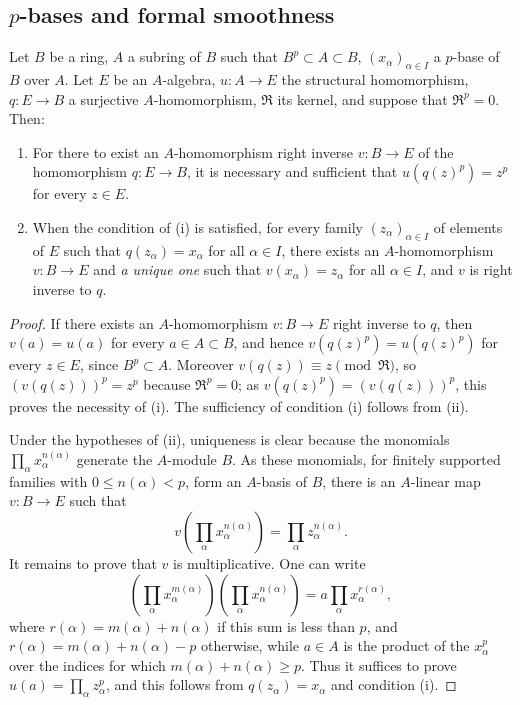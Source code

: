 \subsection{\texorpdfstring{$p$}{p}-bases and formal smoothness}
\label{subsection:0.21.2}

\begin{theorem}[21.2.1]
\label{0.21.2.1}
Let $B$ be a ring, $A$ a subring of $B$ such that $B^p\subset A\subset B$, $(x_\alpha)_{\alpha\in I}$ a $p$-base of $B$ over $A$.
Let $E$ be an $A$-algebra, $u:A\to E$ the structural homomorphism, $q:E\to B$ a surjective $A$-homomorphism, $\mathfrak{R}$ its kernel, and suppose that $\mathfrak{R}^p=0$.
Then:
\begin{enumerate}
  \item[\rm(i)] For there to exist an $A$-homomorphism right inverse $v:B\to E$ of the homomorphism $q:E\to B$, it is necessary and sufficient that $u(q(z)^p)=z^p$ for every $z\in E$.
  \item[\rm(ii)] When the condition of \textup{(i)} is satisfied, for every family $(z_\alpha)_{\alpha\in I}$ of elements of $E$ such that $q(z_\alpha)=x_\alpha$ for all $\alpha\in I$, there exists an $A$-homomorphism $v:B\to E$ and \emph{a unique one} such that $v(x_\alpha)=z_\alpha$ for all $\alpha\in I$, and $v$ is right inverse to $q$.
\end{enumerate}
\end{theorem}

\begin{proof}
If there exists an $A$-homomorphism $v:B\to E$ right inverse to $q$, then $v(a)=u(a)$ for every $a\in A\subset B$, and hence $v(q(z)^p)=u(q(z)^p)$ for every $z\in E$, since $B^p\subset A$.
Moreover $v(q(z))\equiv z\pmod{\mathfrak{R}}$, so $(v(q(z)))^p=z^p$ because $\mathfrak{R}^p=0$; as $v(q(z)^p)=(v(q(z)))^p$, this proves the necessity of (i).
The sufficiency of condition (i) follows from (ii).

Under the hypotheses of (ii), uniqueness is clear because the monomials $\prod_\alpha x_\alpha^{n(\alpha)}$ generate the $A$-module $B$.
As these monomials, for finitely supported families with $0\leq n(\alpha)<p$, form an $A$-basis of $B$, there is an $A$-linear map $v:B\to E$ such that
\[
  v\left(\prod_\alpha x_\alpha^{n(\alpha)}\right)=\prod_\alpha z_\alpha^{n(\alpha)}.
\]
It remains to prove that $v$ is multiplicative. One can write
\[
  \left(\prod_\alpha x_\alpha^{m(\alpha)}\right)\left(\prod_\alpha x_\alpha^{n(\alpha)}\right)=a\prod_\alpha x_\alpha^{r(\alpha)},
\]
where $r(\alpha)=m(\alpha)+n(\alpha)$ if this sum is less than $p$, and $r(\alpha)=m(\alpha)+n(\alpha)-p$ otherwise, while $a\in A$
is the product of the $x_\alpha^p$ over the indices for which $m(\alpha)+n(\alpha)\geq p$.
Thus it suffices to prove $u(a)=\prod_\alpha z_\alpha^p$, and this follows from $q(z_\alpha)=x_\alpha$ and condition (i).
\end{proof}

